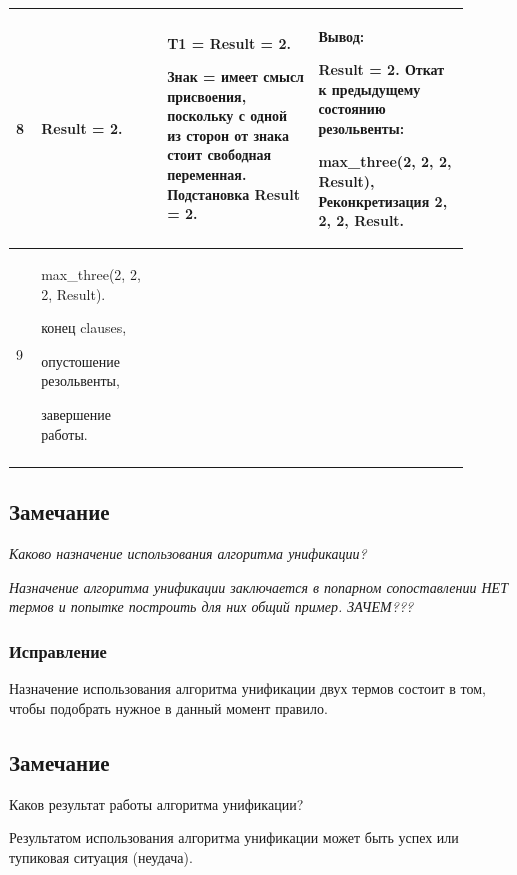 \documentclass[a4paper,12pt]{article}
\begin{document}
\begin{center}
\begin{longtable}[h!]{|p{0.05\linewidth}|p{0.25\linewidth}|p{ 0.3\linewidth}|p{ 0.3\linewidth}|}
			\hline
			
			{8} & {Result = 2.} & {T1 = Result = 2.
				
				
				
				Знак = имеет смысл присвоения, поскольку с одной из сторон от знака стоит свободная переменная. Подстановка Result = 2.} & {Вывод:
				
				
				
				Result = 2. Откат к предыдущему состоянию резольвенты:
				
				max\_three(2, 2, 2, Result), Реконкретизация 2, 2, 2, Result.}\\
			
			\hline
			
			{9} & {max\_three(2, 2, 2, Result).
				
				
				
				конец clauses,
				
				
				
				опустошение резольвенты,
				
				завершение работы.} & {} & {}\\
			
			\hline
			\label{m1}
		\end{longtable}
	\end{center}
	
	\subsection*{Замечание}
	
	\textit{Каково назначение использования алгоритма унификации?}
		
	\textit{Назначение алгоритма унификации заключается в попарном сопоставлении НЕТ термов и попытке построить для них общий пример. ЗАЧЕМ???}
	
	\subsubsection*{Исправление}
	
	Назначение использования алгоритма унификации двух термов состоит в том, чтобы подобрать нужное в данный момент правило.
	
	\subsection*{Замечание}
	
	Каков результат работы алгоритма унификации? 
	
	Результатом использования алгоритма унификации может быть успех или тупиковая ситуация (неудача).
	
\end{document}
